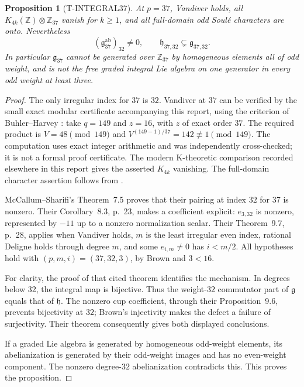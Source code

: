 \documentclass[11pt,a4paper]{article}
\newtheorem{proposition}[theorem]{Proposition}
\theoremstyle{definition}
\begin{document}
\begin{proposition}[T-INTEGRAL37]\label{prop:37-counterexample}
At $p=37$, Vandiver holds, all $K_{4k}(\mathbb Z)\otimes\mathbb Z_{37}$ vanish for $k\geq1$, and all full-domain odd Soul\'e characters are onto. Nevertheless
\[
 (\mathfrak g_{37}^{\mathrm{ab}})_{32}\neq0,
 \qquad
 \mathfrak h_{37,32}\subsetneq\mathfrak g_{37,32}.
\]
In particular $\mathfrak g_{37}$ cannot be generated over $\mathbb Z_{37}$ by homogeneous elements all of odd weight, and is not the free graded integral Lie algebra on one generator in every odd weight at least three.
\end{proposition}

\begin{proof}
The only irregular index for $37$ is $32$. Vandiver at $37$ can be verified by the small exact modular certificate accompanying this report, using the criterion of Buhler--Harvey \cite[\S4, pp.~4--5]{BuhlerHarvey2011}: take $q=149$ and $z=16$, with $z$ of exact order $37$. The required product is $V=48\pmod{149}$ and $V^{(149-1)/37}=142\not\equiv1\pmod{149}$. The computation uses exact integer arithmetic and was independently cross-checked; it is not a formal proof certificate. The modern K-theoretic comparison recorded elsewhere in this report gives the asserted $K_{4k}$ vanishing. The full-domain character assertion follows from \cite[Theorem~1.1(3)]{IshiiKummer2024}.

McCallum--Sharifi's Theorem~7.5 proves that their pairing at index $32$ for $37$ is nonzero. Their Corollary~8.3, p.~23, makes a coefficient explicit: $e_{3,32}$ is nonzero, represented by $-11$ up to a nonzero normalization scalar. Their Theorem~9.7, p.~28, applies when Vandiver holds, $m$ is the least irregular even index, rational Deligne holds through degree $m$, and some $e_{i,m}\neq0$ has $i<m/2$. All hypotheses hold with $(p,m,i)=(37,32,3)$, by Brown and $3<16$.

For clarity, the proof of that cited theorem identifies the mechanism. In degrees below $32$, the integral map is bijective. Thus the weight-$32$ commutator part of $\mathfrak g$ equals that of $\mathfrak h$. The nonzero cup coefficient, through their Proposition~9.6, prevents bijectivity at $32$; Brown's injectivity makes the defect a failure of surjectivity. Their theorem consequently gives both displayed conclusions.

If a graded Lie algebra is generated by homogeneous odd-weight elements, its abelianization is generated by their odd-weight images and has no even-weight component. The nonzero degree-$32$ abelianization contradicts this. This proves the proposition.
\end{proof}
\end{document}
